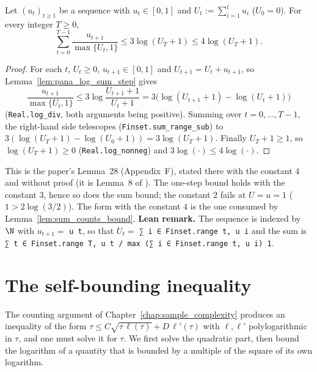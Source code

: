 \begin{lemma}\label{lem:log_sum_bound}
\leanok
Let $(u_t)_{t \ge 1}$ be a sequence with $u_t \in [0, 1]$ and $U_t := \sum_{i = 1}^t u_i$
($U_0 = 0$). For every integer $T \ge 0$,
\[
  \sum_{t = 0}^{T - 1}\frac{u_{t + 1}}{\max\{U_t, 1\}} \le 3\log(U_{T} + 1) \le 4\log(U_{T} + 1) .
\]
\end{lemma}

\begin{proof}
\leanok
For each $t$, $U_t \ge 0$, $u_{t+1} \in [0,1]$ and $U_{t+1} = U_t + u_{t+1}$, so
Lemma~\ref{lem:pana_log_sum_step} gives
\[
  \frac{u_{t + 1}}{\max\{U_t, 1\}} \le 3\log\frac{U_{t+1} + 1}{U_t + 1}
  = 3\big(\log(U_{t+1} + 1) - \log(U_t + 1)\big)
\]
(\texttt{Real.log\_div}, both arguments being positive). Summing over $t = 0, \dots, T - 1$, the
right-hand side telescopes (\texttt{Finset.sum\_range\_sub}) to
$3(\log(U_{T} + 1) - \log(U_0 + 1)) = 3\log(U_{T} + 1)$. Finally $U_{T} + 1 \ge 1$, so
$\log(U_{T} + 1) \ge 0$ (\texttt{Real.log\_nonneg}) and $3\log(\cdot) \le 4\log(\cdot)$.
\end{proof}

\begin{remark}\label{rem:pana_log_sum_const}
This is the paper's Lemma~28 (Appendix~F), stated there with the constant $4$ and without
proof (it is Lemma~8 of \cite{menard2021fast}). The one-step bound holds with the constant
$3$, hence so does the sum bound; the constant $2$ fails at $U = u = 1$ ($1 > 2\log(3/2)$).
The form with the constant $4$ is the one consumed by
Lemma~\ref{lem:sum_counts_bound}. \textbf{Lean remark.} The sequence is indexed by $\N$ with
$u_{t+1} = $ \texttt{u t}, so that $U_t = $ \texttt{∑ i ∈ Finset.range t, u i} and the sum is
\texttt{∑ t ∈ Finset.range T, u t / max (∑ i ∈ Finset.range t, u i) 1}.
\end{remark}

\section{The self-bounding inequality}
\label{sec:pre_analysis_self_bounding}

The counting argument of Chapter~\ref{chap:sample_complexity} produces an inequality of the
form $\tau \le C\sqrt{\tau\,\ell(\tau)} + D\,\ell'(\tau)$ with $\ell, \ell'$ polylogarithmic in
$\tau$, and one must solve it for $\tau$. We first solve the quadratic part, then bound the
logarithm of a quantity that is bounded by a multiple of the square of its own logarithm.

